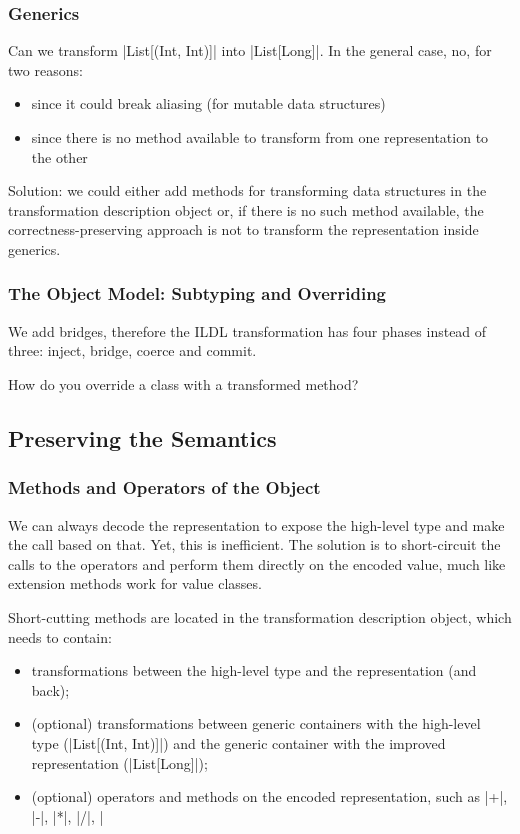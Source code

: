 \subsubsection{Generics}

Can we transform |List[(Int, Int)]| into |List[Long]|. In the general case, no, for two reasons:
\begin{itemize}
  \item since it could break aliasing (for mutable data structures)
  \item since there is no method available to transform from one representation to the other
\end{itemize}

Solution: we could either add methods for transforming data structures in the transformation description object or, if there is no such method available, the correctness-preserving approach is not to transform the representation inside generics.


\subsubsection{The Object Model: Subtyping and Overriding}
We add bridges, therefore the ILDL transformation has four phases instead of three: inject, bridge, coerce and commit.

How do you override a class with a transformed method?

\subsection{Preserving the Semantics}
\label{sec:ildl:semantics}

\subsubsection{Methods and Operators of the Object}
We can always decode the representation to expose the high-level type and make the call based on that. Yet, this is inefficient. The solution is to short-circuit the calls to the operators and perform them directly on the encoded value, much like extension methods work for value classes.

Short-cutting methods are located in the transformation description object, which needs to contain:
\begin{itemize}
  \item transformations between the high-level type and the representation (and back);
  \item (optional) transformations between generic containers with the high-level type (|List[(Int, Int)]|) and the generic container with the improved representation (|List[Long]|);
  \item (optional) operators and methods on the encoded representation, such as |+|, |-|, |*|, |/|, |%
\end{itemize}

